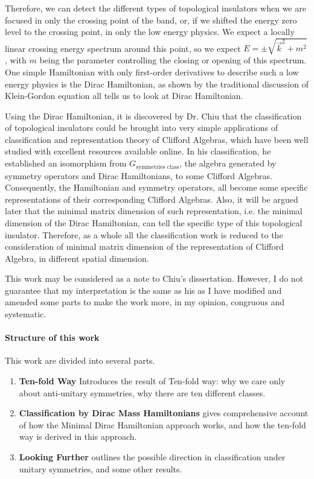 Therefore, we can detect the different types of topological insulators when we
are focused in only the crossing point of the band, or, if we shifted the
energy zero level to the crossing point, in only the low energy physics. We
expect a locally linear crossing energy spectrum around this point, so we expect
$E=\pm\sqrt{\vec{k}^2+m^2}$, with $m$ being the parameter controlling the closing or
opening of this spectrum. One simple Hamiltonian with only first-order derivatives to
describe such a low energy physics is the Dirac Hamiltonian, as shown by the
traditional discussion of Klein-Gordon equation all tells us to look at Dirac
Hamiltonian.

Using the Dirac Hamiltonian, it is discovered by Dr. Chiu \cite{Chiu2013a} that
the classification of topological insulators could be brought into very
simple applications of classification and representation theory of Clifford
Algebras, which have been well studied with excellent resources available online.
In his classification, he established an isomorphism from $G_{\text{symmetries 
class}}$, the algebra generated by symmetry operators and Dirac Hamiltonians, to
some Clifford Algebras. Consequently, the Hamiltonian and symmetry operators,
all become some specific representations of their corresponding Clifford
Algebras. Also, it will be argued later that the minimal matrix dimension of
such representation, i.e. the minimal dimension of the Dirac Hamiltonian, can
tell the specific type of this topological insulator. Therefore, as a whole all
the classification work is reduced to the consideration of minimal matrix
dimension of the representation of Clifford Algebra, in different spatial
dimension.

This work may be considered as a note to Chiu's dissertation\cite{Chiu2013a}.
However, I do not guarantee that my interpretation is the same as his as I have
modified and amended some parts to make the work more, in my opinion, congruous
and systematic.

\paragraph{Structure of this work} This work are divided into several parts.
\begin{enumerate}
    \item \textbf{Ten-fold Way} Introduces the result of Ten-fold way: why we
        care only about anti-unitary symmetries, why there are ten different
        classes.
    \item \textbf{Classification by Dirac Mass Hamiltonians} gives comprehensive
        account of how the Minimal Dirac Hamiltonian approach works, and how the
        ten-fold way is derived in this approach.
    \item \textbf{Looking Further} outlines the possible direction in classification
        under unitary symmetries, and some other results.
\end{enumerate}

